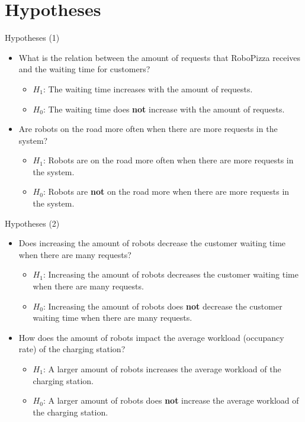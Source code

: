 \section{Hypotheses}

\begin{frame}{Hypotheses (1)}
    \begin{itemize}
        \setlength\itemsep{1.5em}

        \item What is the relation between the amount of requests that RoboPizza receives and the waiting time for customers?
            \begin{itemize}
                \item $H_1$: The waiting time increases with the amount of requests.
                \item $H_0$: The waiting time does \textbf{not} increase with the amount of requests.
            \end{itemize}

        \item Are robots on the road more often when there are more requests in the system?
            \begin{itemize}
                \item $H_1$: Robots are on the road more often when there are more requests in the system.
                \item $H_0$: Robots are \textbf{not} on the road more when there are more requests in the system.
            \end{itemize}
    \end{itemize}
\end{frame}

\begin{frame}{Hypotheses (2)}
    \begin{itemize}
        \setlength\itemsep{1.5em}

        \item Does increasing the amount of robots decrease the customer waiting time when there are many requests?
            \begin{itemize}
                \item $H_1$: Increasing the amount of robots decreases the customer waiting time when there are many requests.
                \item $H_0$: Increasing the amount of robots does \textbf{not} decrease the customer waiting time when there are many requests.
            \end{itemize}

        \item How does the amount of robots impact the average workload (occupancy rate) of the charging station?
            \begin{itemize}
                \item $H_1$: A larger amount of robots increases the average workload of the charging station.
                \item $H_0$: A larger amount of robots does \textbf{not} increase the average workload of the charging station.
            \end{itemize}
    \end{itemize}
\end{frame}

